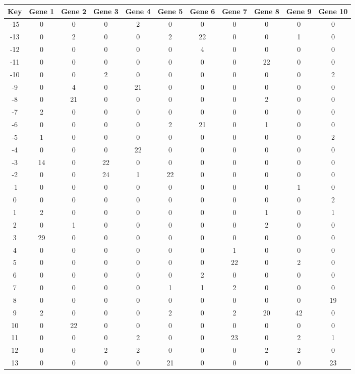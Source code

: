 \begin{tabular}{|c|c|c|c|c|c|c|c|c|c|c|}
\hline
Key & Gene 1 & Gene 2 & Gene 3 & Gene 4 & Gene 5 & Gene 6 & Gene 7 & Gene 8 & Gene 9 & Gene 10 \\
\hline
-15 & 0 & 0 & 0 & 2 & 0 & 0 & 0 & 0 & 0 & 0 \\
-13 & 0 & 2 & 0 & 0 & 2 & 22 & 0 & 0 & 1 & 0 \\
-12 & 0 & 0 & 0 & 0 & 0 & 4 & 0 & 0 & 0 & 0 \\
-11 & 0 & 0 & 0 & 0 & 0 & 0 & 0 & 22 & 0 & 0 \\
-10 & 0 & 0 & 2 & 0 & 0 & 0 & 0 & 0 & 0 & 2 \\
-9 & 0 & 4 & 0 & 21 & 0 & 0 & 0 & 0 & 0 & 0 \\
-8 & 0 & 21 & 0 & 0 & 0 & 0 & 0 & 2 & 0 & 0 \\
-7 & 2 & 0 & 0 & 0 & 0 & 0 & 0 & 0 & 0 & 0 \\
-6 & 0 & 0 & 0 & 0 & 2 & 21 & 0 & 1 & 0 & 0 \\
-5 & 1 & 0 & 0 & 0 & 0 & 0 & 0 & 0 & 0 & 2 \\
-4 & 0 & 0 & 0 & 22 & 0 & 0 & 0 & 0 & 0 & 0 \\
-3 & 14 & 0 & 22 & 0 & 0 & 0 & 0 & 0 & 0 & 0 \\
-2 & 0 & 0 & 24 & 1 & 22 & 0 & 0 & 0 & 0 & 0 \\
-1 & 0 & 0 & 0 & 0 & 0 & 0 & 0 & 0 & 1 & 0 \\
0 & 0 & 0 & 0 & 0 & 0 & 0 & 0 & 0 & 0 & 2 \\
1 & 2 & 0 & 0 & 0 & 0 & 0 & 0 & 1 & 0 & 1 \\
2 & 0 & 1 & 0 & 0 & 0 & 0 & 0 & 2 & 0 & 0 \\
3 & 29 & 0 & 0 & 0 & 0 & 0 & 0 & 0 & 0 & 0 \\
4 & 0 & 0 & 0 & 0 & 0 & 0 & 1 & 0 & 0 & 0 \\
5 & 0 & 0 & 0 & 0 & 0 & 0 & 22 & 0 & 2 & 0 \\
6 & 0 & 0 & 0 & 0 & 0 & 2 & 0 & 0 & 0 & 0 \\
7 & 0 & 0 & 0 & 0 & 1 & 1 & 2 & 0 & 0 & 0 \\
8 & 0 & 0 & 0 & 0 & 0 & 0 & 0 & 0 & 0 & 19 \\
9 & 2 & 0 & 0 & 0 & 2 & 0 & 2 & 20 & 42 & 0 \\
10 & 0 & 22 & 0 & 0 & 0 & 0 & 0 & 0 & 0 & 0 \\
11 & 0 & 0 & 0 & 2 & 0 & 0 & 23 & 0 & 2 & 1 \\
12 & 0 & 0 & 2 & 2 & 0 & 0 & 0 & 2 & 2 & 0 \\
13 & 0 & 0 & 0 & 0 & 21 & 0 & 0 & 0 & 0 & 23 \\
\hline
\end{tabular}